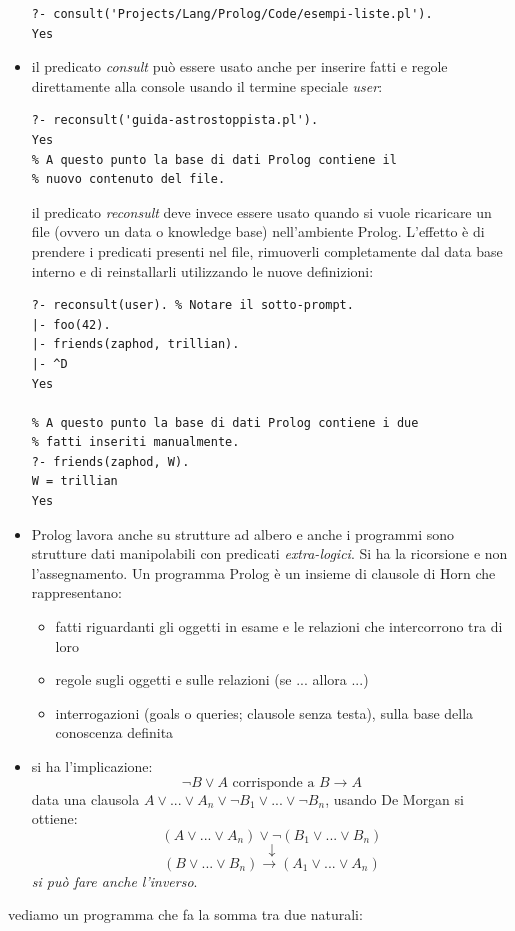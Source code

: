 \documentclass[a4paper,12pt, oneside]{book}
\begin{document}
\begin{itemize}
\begin{verbatim}
?- consult('Projects/Lang/Prolog/Code/esempi-liste.pl').
Yes
\end{verbatim}
	\item il predicato \textit{consult} può essere usato anche per inserire fatti e regole direttamente alla console usando il termine speciale \textit{user}:
	      \begin{verbatim}
?- reconsult('guida-astrostoppista.pl').
Yes
% A questo punto la base di dati Prolog contiene il
% nuovo contenuto del file.
\end{verbatim}
	      il predicato \textit{reconsult} deve invece essere usato quando si vuole ricaricare un file (ovvero un data o knowledge base) nell'ambiente Prolog. L'effetto è di prendere i predicati presenti nel file, rimuoverli completamente dal data base interno e di reinstallarli utilizzando le nuove definizioni:
	      \begin{verbatim}
?- reconsult(user). % Notare il sotto-prompt.
|- foo(42).
|- friends(zaphod, trillian).
|- ^D
Yes

% A questo punto la base di dati Prolog contiene i due
% fatti inseriti manualmente.
?- friends(zaphod, W).
W = trillian
Yes
\end{verbatim}
	\item Prolog lavora anche su strutture ad albero e anche i programmi sono strutture dati manipolabili con predicati \textit{extra-logici}. Si ha la ricorsione e non l'assegnamento. Un programma Prolog è un insieme di clausole di Horn che rappresentano:
	      \begin{itemize}
		      \item fatti riguardanti gli oggetti in esame e le relazioni che intercorrono tra di loro
		      \item regole sugli oggetti e sulle relazioni (se ... allora ...)
		      \item interrogazioni (goals o queries; clausole senza testa), sulla base della conoscenza definita
	      \end{itemize}
	\item si ha l'implicazione:
	      $$\neg B \vee A \mbox{ corrisponde a } B\to A$$
	      data una clausola $A\vee ... \vee A_n\vee \neg B_1\vee ... \vee\neg B_n$, usando De Morgan si ottiene:
	      $$(A\vee ... \vee A_n)\vee \neg (B_1\vee ... \vee B_n)$$
	      $$\downarrow$$
	      $$(B\vee ... \vee B_n)\to (A_1\vee ... \vee A_n)$$
	      \textit{si può fare anche l'inverso}.\\
\end{itemize}
vediamo un programma che fa la somma tra due naturali:
\end{document}
